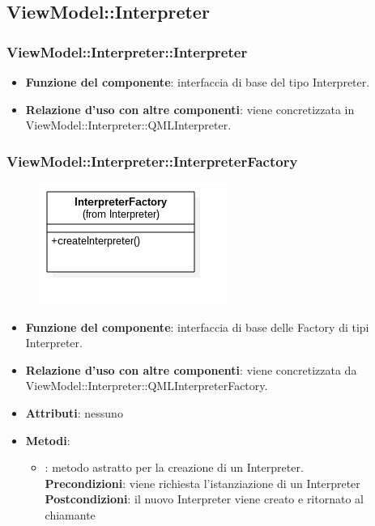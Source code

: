 \subsection{ViewModel::Interpreter}
\subsubsection{ViewModel::Interpreter::Interpreter}
\begin{itemize}
\item\textbf{Funzione del componente}: interfaccia di base del tipo Interpreter.
	\item\textbf{Relazione d'uso con altre componenti}: viene concretizzata in ViewModel::Interpreter::QMLInterpreter.\\
\end{itemize}
\subsubsection{ViewModel::Interpreter::InterpreterFactory}
\begin{figure}[h!]
\begin{center}
	\includegraphics[scale=0.4]{../images/ViewModel/Interpreter/InterpreterFactory.png}
\end{center}
\end{figure}
\begin{itemize}
\item\textbf{Funzione del componente}: interfaccia di base delle Factory di tipi Interpreter.
	\item\textbf{Relazione d'uso con altre componenti}: viene concretizzata da\\ ViewModel::Interpreter::QMLInterpreterFactory.\\ 
\item\textbf{Attributi}: nessuno
\item\textbf{Metodi}:
	\begin{itemize}
		\item{}: metodo astratto per la creazione di un Interpreter.\\
		\textbf{Precondizioni}: viene richiesta l'istanziazione di un Interpreter\\
		\textbf{Postcondizioni}: il nuovo Interpreter viene creato e ritornato al chiamante\\
	\end{itemize}
\end{itemize}

